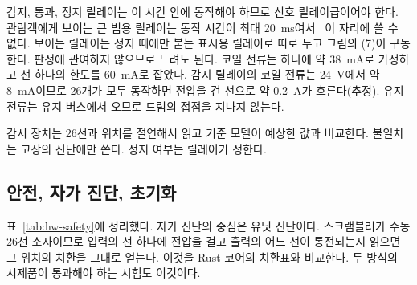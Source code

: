 감지, 통과, 정지 릴레이는 이 시간 안에 동작해야 하므로 신호 릴레이급이어야 한다. 관람객에게 보이는 큰 범용
릴레이는 동작 시간이 최대 20~ms여서~\cite{omron-my4} 이 자리에 쓸 수 없다. 보이는 릴레이는 정지 때에만 붙는
표시용 릴레이로 따로 두고 그림의 (7)이 구동한다. 판정에 관여하지 않으므로 느려도 된다. 코일 전류는 하나에
약 38~mA로 가정하고 선 하나의 한도를 60~mA로 잡았다. 감지 릴레이의 코일 전류는 24~V에서 약 8~mA이므로 26개가 모두
동작하면 전압을 건 선으로 약 0.2~A가 흐른다(추정). 유지 전류는 유지 버스에서 오므로 드럼의 접점을 지나지
않는다.

감시 장치는 26선과 위치를 절연해서 읽고 기준 모델이 예상한 값과 비교한다. 불일치는 고장의 진단에만 쓴다.
정지 여부는 릴레이가 정한다.

\subsection{안전, 자가 진단, 초기화}

표~\ref{tab:hw-safety}에 정리했다. 자가 진단의 중심은 유닛 진단이다. 스크램블러가 수동 26선 소자이므로
입력의 선 하나에 전압을 걸고 출력의 어느 선이 통전되는지 읽으면 그 위치의 치환을 그대로 얻는다. 이것을
Rust 코어의 치환표와 비교한다. 두 방식의 시제품이 통과해야 하는 시험도 이것이다.

